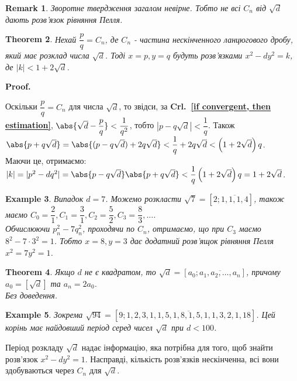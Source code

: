 \documentclass[a4paper, 10pt]{article}
\makeatletter
\theoremstyle{theoremdd}
\newtheorem{theorem}{Theorem}[subsection]
\theoremstyle{theoremdd}
\theoremstyle{theoremdd}
\theoremstyle{theoremdd}
\newtheorem{example}[theorem]{Example}
\theoremstyle{theoremdd}
\theoremstyle{theoremdd}
\newtheorem{remark}[theorem]{Remark}
\theoremstyle{theoremdd}
\theoremstyle{theoremdd}
\renewenvironment{proof}[1][Proof.\\]{\par
\pushQED{\hfill \qed}%
\normalfont \topsep6\p@\@plus6\p@\relax
\trivlist
\item\relax
{\bfseries
#1\@addpunct{.}}\hspace\labelsep\ignorespaces
}{%
\popQED\endtrivlist\@endpefalse
}
\newcommand\crlref[1]{\textbf{Crl.~\ref{#1}}}
\makeatother
\begin{document}
\begin{remark}
Зворотне твердження загалом невірне. Тобто не всі $C_n$ від $\sqrt{d}$ дають розв'язок рівняння Пелля.
\end{remark}

\begin{theorem}
Нехай $\dfrac{p}{q} = C_n$, де $C_n$ - частина нескінченного ланцюгового дробу, який має розклад числа $\sqrt{d}$. Тоді $x = p, y = q$ будуть розв'язками $x^2 - dy^2 = k$, де $|k| < 1 + 2 \sqrt{d}$.
\end{theorem}

\begin{proof}
Оскільки $\dfrac{p}{q} = C_n$ для числа $\sqrt{d}$, то звідси, за \crlref{if convergent, then estimation}, $\abs{\sqrt{d} - \dfrac{p}{q}} < \dfrac{1}{q^2}$, тобто $|p-q\sqrt{d}| < \dfrac{1}{q}$. Також\\
$\abs{p + q \sqrt{d}} = \abs{(p - q \sqrt{d}) + 2q \sqrt{d}} < \dfrac{1}{q} + 2 q \sqrt{d} < \left( 1 + 2\sqrt{d} \right)q$.\\
Маючи це, отримаємо:\\
$|k| = |p^2 - dq^2| = \abs{p-q \sqrt{d}} \abs{p + q\sqrt{d}} < \dfrac{1}{q} \left(1+2 \sqrt{d} \right)q = 1 + 2 \sqrt{d}$.
\end{proof}

\begin{example}
Випадок $d = 7$. Можемо розкласти $\sqrt{7} = [2; \overline{1,1,1,4}]$, також маємо $C_0 = \dfrac{2}{1}, C_1 = \dfrac{3}{1}, C_2 = \dfrac{5}{2}, C_3 = \dfrac{8}{3}, \dots$.\\
Обчислюючи $p_n^2 - 7q_n^2$, проходячи по $C_n$, отримаємо, що при $C_3$ маємо $8^2 - 7 \cdot 3^2 = 1$. Тобто $x = 8, y = 3$ дає додатний розв'ящок рівняння Пелля $x^2 = 7y^2 = 1$.
\end{example}

\begin{theorem}
Якщо $d$ не є квадратом, то $\sqrt{d} = [a_0; \overline{a_1,a_2,\dots,a_n}]$, причому $a_0 = \left[ \sqrt{d} \right]$ та $a_n = 2a_0$.\\
\textit{Без доведення.}
\end{theorem}

\begin{example}
Зокрема $\sqrt{94} = [9; \overline{1,2,3,1,1,5,1,8,1,5,1,1,3,2,1,18}]$. Цей корінь має найдовший період серед чисел $\sqrt{d}$ при $d < 100$.
\end{example}

Період розкладу $\sqrt{d}$ надає інформацію, яка потрібна для того, щоб знайти розв'язок $x^2 - dy^2 = 1$. Насправді, кількість розв'язків нескінченна, всі вони здобуваються через $C_n$ для $\sqrt{d}$.
\end{document}
